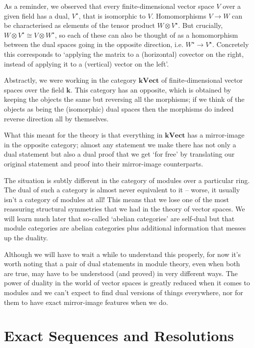 \documentclass[oneside,english]{amsbook}
\numberwithin{section}{chapter}
\theoremstyle{plain}
\theoremstyle{definition}
\newcommand{\kVect}{\mathbf{k}\mathbf{Vect}}
\begin{document}
			As a reminder, we observed that every finite-dimensional vector space $V$ over a given field has a dual, $V^\star$, that is isomorphic to $V$. Homomorphisms $V\to W$ can be characterised as elements of the tensor product $W\otimes V^\star$. But crucially, $W\otimes V^\star\cong V\otimes W^\star$, so each of these can also be thought of as a homomorphism between the dual spaces going in the opposite direction, i.e. $W^\star\to V^\star$. Concretely this corresponds to `applying the matrix to a (horizontal) covector on the right, instead of applying it to a (vertical) vector on the left'.
			
			Abstractly, we were working in the category $\kVect$ of finite-dimensional vector spaces over the field $\mathbf{k}$. This category has an opposite, which is obtained by keeping the objects the same but reversing all the morphisms; if we think of the objects as being the (isomorphic) dual spaces then the morphisms do indeed reverse direction all by themselves.
			
			What this meant for the theory is that everything in $\kVect$ has a mirror-image in the opposite category; almost any statement we make there has not only a dual statement but also a dual proof that we get `for free' by translating our original statement and proof into their mirror-image counterparts.
			
			The situation is subtly different in the category of modules over a particular ring. The dual of such a category is almost never equivalent to it -- worse, it usually isn't a category of modules at all! This means that we lose one of the most reassuring structural symmetries that we had in the theory of vector spaces. We will learn much later that so-called `abelian categories' are self-dual but that module categories are abelian categories plus additional information that messes up the duality. 
			
			Although we will have to wait a while to understand this properly, for now it's worth noting that a pair of dual statements in module theory, even when both are true, may have to be understood (and proved) in very different ways. The power of duality in the world of vector spaces is greatly reduced when it comes to modules and we can't expect to find dual versions of things everywhere, nor for them to have exact mirror-image features when we do.

	\chapter{Exact Sequences and Resolutions}
		
\end{document}
